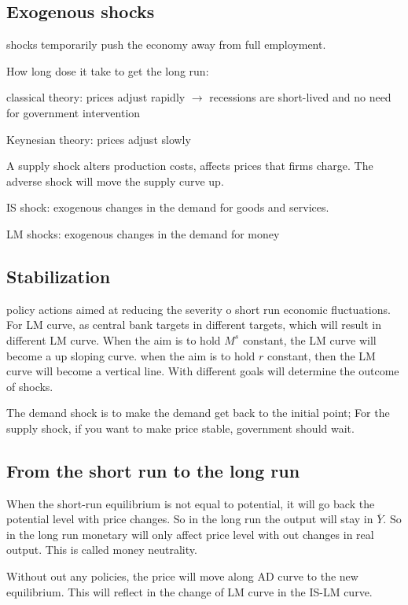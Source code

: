 \documentclass[10pt, a4paper]{article}
\begin{document}
    \subsection{Exogenous shocks} 
        shocks temporarily push the economy away from full employment.

        How long dose it take to get the long run: 

        \quad classical theory: prices adjust rapidly $\rightarrow$ recessions are short-lived and no need for government intervention 

        \quad Keynesian theory: prices adjust slowly 

        A supply shock alters production costs, affects prices that firms charge. The adverse shock will move the supply curve up. 

        IS shock: exogenous changes in the demand for goods and services.

        LM shocks: exogenous changes in the demand for money 

    \subsection{Stabilization}
        policy actions aimed at reducing the severity o short run economic fluctuations. For LM curve, as central bank targets in different targets, which will result in different LM curve. When the aim is to hold $M^s$ constant, the LM curve will become a up sloping curve. when the aim is to hold $r$ constant, then the LM curve will become a vertical line. With different goals will determine the outcome of shocks. 

        The demand shock is to make the demand get back to the initial point; For the supply shock, if you want to make price stable, government should wait. 

    \subsection{From the short run to the long run} 
        When the short-run equilibrium is not equal to potential, it will go back the potential level with price changes. So in the long run the output will stay in $\overline{Y}$. So in the long run monetary will only affect price level with out changes in real output. This is called money  neutrality. 

        Without out any policies, the price will move along AD curve to the new equilibrium. This will reflect in the change of LM curve in the IS-LM curve. 
\newpage
\end{document}

